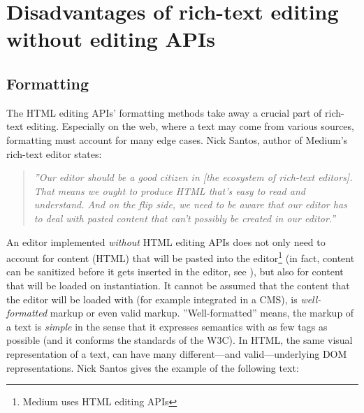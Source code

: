
\section{Disadvantages of rich-text editing without editing APIs}

\subsection{Formatting}
\label{subsec:noapi_dis_formatting}
The HTML editing APIs' formatting methods take away a crucial part of rich-text editing. Especially on the web, where a text may come from various sources, formatting must account for many edge cases. Nick Santos, author of Medium's rich-text editor states:

\begin{quotation}
\textit{''Our editor should be a good citizen in [the ecosystem of rich-text editors]. That means we ought to produce HTML that's easy to read and understand. And on the flip side, we need to be aware that our editor has to deal with pasted content that can't possibly be created in our editor.\cite{so_paste_plain}''}
\end{quotation}


An editor implemented \textit{without} HTML editing APIs does not only need to account for content (HTML) that will be pasted into the editor\footnote{Medium uses HTML editing APIs} (in fact, content can be sanitized before it gets inserted in the editor, see ), but also for content that will be loaded on instantiation. It cannot be assumed that the content that the editor will be loaded with (for example integrated in a CMS), is \textit{well-formatted} markup or even valid markup. ''Well-formatted'' means, the markup of a text is \textit{simple} in the sense that it expresses semantics with as few tags as possible (and it conforms the standards  of the W3C). In HTML, the same visual representation of a text, can have many different---and valid---underlying DOM representations. Nick Santos gives the example of the following text\cite{so_paste_plain}:


